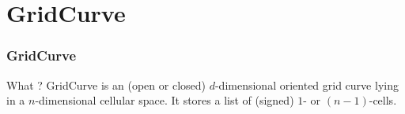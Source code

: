 \section{GridCurve}

\begin{frame}
  \frametitle{GridCurve}

  \begin{block}{What ?}
GridCurve is an (open or closed) $d$-dimensional oriented grid curve 
lying in a $n$-dimensional cellular space. 
It stores a list of (signed) $1$- or $(n-1)$-cells. 
  \end{block}

 \begin{figure}
   \centering
\end{figure}
\end{frame}

